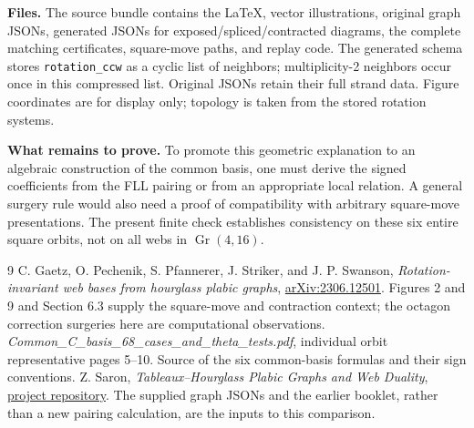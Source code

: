 \documentclass[11pt]{article}
\begin{document}
\textbf{Files.} The source bundle contains the LaTeX, vector illustrations,
original graph JSONs, generated JSONs for exposed/spliced/contracted diagrams,
the complete matching certificates, square-move paths, and replay code.
The generated schema stores \texttt{rotation\_ccw} as a cyclic list of
neighbors; multiplicity-2 neighbors occur once in this compressed list.
Original JSONs retain their full strand data. Figure coordinates are for
display only; topology is taken from the stored rotation systems.

\textbf{What remains to prove.} To promote this geometric explanation to an
algebraic construction of the common basis, one must derive the signed
coefficients from the FLL pairing or from an appropriate local relation. A
general surgery rule would also need a proof of compatibility with arbitrary
square-move presentations. The present finite check establishes consistency
on these six entire square orbits, not on all webs in $\operatorname{Gr}(4,16)$.

\begin{thebibliography}{9}\small
{} C. Gaetz, O. Pechenik, S. Pfannerer, J. Striker, and J. P.
Swanson, \emph{Rotation-invariant web bases from hourglass plabic graphs},
\href{https://arxiv.org/abs/2306.12501}{arXiv:2306.12501}.
Figures 2 and 9 and Section 6.3 supply the square-move and contraction context;
the octagon correction surgeries here are computational observations.
 \emph{Common\_C\_basis\_68\_cases\_and\_theta\_tests.pdf},
individual orbit representative pages 5--10. Source of the six common-basis
formulas and their sign conventions.
 Z. Saron, \emph{Tableaux--Hourglass Plabic Graphs and Web Duality},
\href{https://github.com/zsaron-555/Tableaux-Hourglass-Plabic-Graphs-and-Web-Duality}{project repository}.
The supplied graph JSONs and the earlier booklet, rather than a new pairing
calculation, are the inputs to this comparison.
\end{thebibliography}
\end{document}
